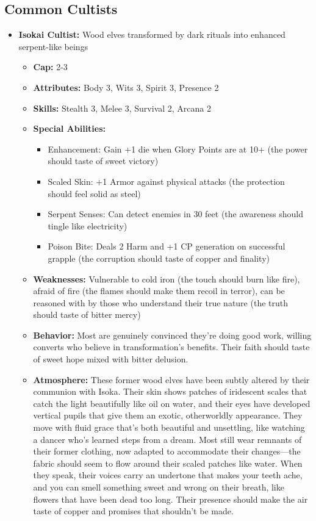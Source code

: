 \documentclass[11pt]{article}
\begin{document}
\subsection{Common Cultists}
\begin{itemize}
\item \textbf{Isokai Cultist:} Wood elves transformed by dark rituals into enhanced serpent-like beings
  \begin{itemize}
  \item \textbf{Cap:} 2-3
  \item \textbf{Attributes:} Body 3, Wits 3, Spirit 3, Presence 2
  \item \textbf{Skills:} Stealth 3, Melee 3, Survival 2, Arcana 2
  \item \textbf{Special Abilities:}
    \begin{itemize}
    \item Enhancement: Gain +1 die when Glory Points are at 10+ (the power should taste of sweet victory)
    \item Scaled Skin: +1 Armor against physical attacks (the protection should feel solid as steel)
    \item Serpent Senses: Can detect enemies in 30 feet (the awareness should tingle like electricity)
    \item Poison Bite: Deals 2 Harm and +1 CP generation on successful grapple (the corruption should taste of copper and finality)
    \end{itemize}
  \item \textbf{Weaknesses:} Vulnerable to cold iron (the touch should burn like fire), afraid of fire (the flames should make them recoil in terror), can be reasoned with by those who understand their true nature (the truth should taste of bitter mercy)
  \item \textbf{Behavior:} Most are genuinely convinced they're doing good work, willing converts who believe in transformation's benefits. Their faith should taste of sweet hope mixed with bitter delusion.
  \item \textbf{Atmosphere:} These former wood elves have been subtly altered by their communion with Isoka. Their skin shows patches of iridescent scales that catch the light beautifully like oil on water, and their eyes have developed vertical pupils that give them an exotic, otherworldly appearance. They move with fluid grace that's both beautiful and unsettling, like watching a dancer who's learned steps from a dream. Most still wear remnants of their former clothing, now adapted to accommodate their changes—the fabric should seem to flow around their scaled patches like water. When they speak, their voices carry an undertone that makes your teeth ache, and you can smell something sweet and wrong on their breath, like flowers that have been dead too long. Their presence should make the air taste of copper and promises that shouldn't be made.
  \end{itemize}


\end{itemize}
\end{document}
